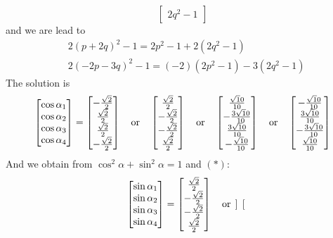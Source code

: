 \documentclass[12pt]{article}
\def\ff#1#2{\frac{#1}{#2}}
\begin{document}
{\[\begin{bmatrix}
2q^2-1
\end{bmatrix}
\]
and we are lead to
\begin{align*}
&2{(p+2q)}^2-1=2p^2-1+2(2q^2-1)\\
&2{(-2p-3q)}^2-1=(-2)(2p^2-1)-3(2q^2-1)
\end{align*}
The solution is
\[
\begin{bmatrix}
\cos\alpha_1\\
\cos\alpha_2\\
\cos\alpha_3\\
\cos\alpha_4
\end{bmatrix}
=
\begin{bmatrix}
-\ff{\sqrt2}{2}\\
\ff{\sqrt2}{2}\\
\ff{\sqrt2}{2}\\
-\ff{\sqrt2}{2}
\end{bmatrix}
\quad{\rm or}\quad
\begin{bmatrix}
\ff{\sqrt2}{2}\\
-\ff{\sqrt2}{2}\\
-\ff{\sqrt2}{2}\\
\ff{\sqrt2}{2}
\end{bmatrix}
\quad{\rm or}\quad
\begin{bmatrix}
\ff{\sqrt10}{10}\\
-\ff{3\sqrt10}{10}\\
\ff{3\sqrt10}{10}\\
-\ff{\sqrt10}{10}
\end{bmatrix}
\quad{\rm or}\quad
\begin{bmatrix}
-\ff{\sqrt10}{10}\\
\ff{3\sqrt10}{10}\\
-\ff{3\sqrt10}{10}\\
\ff{\sqrt10}{10}
\end{bmatrix}
\]
And we obtain from $\cos^2{\alpha}+\sin^2{\alpha}=1$ and $(*)$:
\[
\begin{bmatrix}
\sin\alpha_1\\
\sin\alpha_2\\
\sin\alpha_3\\
\sin\alpha_4
\end{bmatrix}
=
\begin{bmatrix}
\ff{\sqrt2}{2}\\
-\ff{\sqrt2}{2}\\
-\ff{\sqrt2}{2}\\
\ff{\sqrt2}{2}
\end{bmatrix}
\quad{\rm or}\quad
\begin{bmatrix}

\end{bmatrix}\]}
\end{document}
